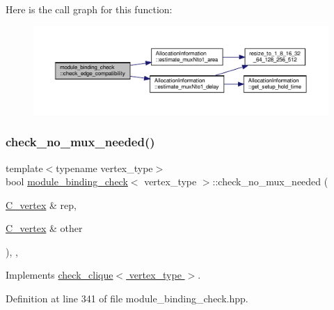 Here is the call graph for this function\+:
\nopagebreak
\begin{figure}[H]
\begin{center}
\leavevmode
\includegraphics[width=350pt]{d1/dc5/structmodule__binding__check_a36a3f9d2c01d19f8a3d4b0a2bbc0d021_cgraph}
\end{center}
\end{figure}
\mbox{\label{structmodule__binding__check_a4bea04fdfc26b2ec8c1f98f7b1fff592}} 
\subsubsection{\texorpdfstring{check\+\_\+no\+\_\+mux\+\_\+needed()}{check\_no\_mux\_needed()}}
{\footnotesize\ttfamily template$<$typename vertex\+\_\+type$>$ \\
bool \hyperlink{structmodule__binding__check}{module\+\_\+binding\+\_\+check}$<$ vertex\+\_\+type $>$\+::check\+\_\+no\+\_\+mux\+\_\+needed (\begin{DoxyParamCaption}\item[{\hyperlink{clique__covering__graph_8hpp_a9cb45047ea8c5ed95a8cfa90494345aa}{C\+\_\+vertex} \&}]{rep,  }\item[{\hyperlink{clique__covering__graph_8hpp_a9cb45047ea8c5ed95a8cfa90494345aa}{C\+\_\+vertex} \&}]{other }\end{DoxyParamCaption})\hspace{0.3cm}{\ttfamily [inline]}, {\ttfamily [override]}, {\ttfamily [virtual]}}



Implements \hyperlink{structcheck__clique_ad6179189438c0cf415aa52e9c831e854}{check\+\_\+clique$<$ vertex\+\_\+type $>$}.



Definition at line 341 of file module\+\_\+binding\+\_\+check.\+hpp.



